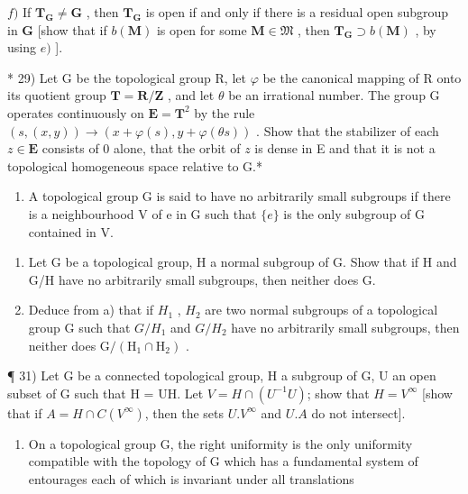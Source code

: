 \(f)\) If \(\mathbf{T}_{\mathbf{G}} \neq \mathbf{G}\) , then \(\mathbf{T}_{\mathbf{G}}\) is open if and only if there is a residual open subgroup in \(\mathbf{G}\) {[}show that if \(b(\mathbf{M})\) is open for some \(\mathbf{M} \in \mathfrak{M}\) , then \(\mathbf{T}_{\mathbf{G}} \supset b(\mathbf{M})\) , by using \(e)\) {]}.

* 29) Let G be the topological group R, let \(\varphi\) be the canonical mapping of R onto its quotient group \(\mathbf{T} = \mathbf{R} / \mathbf{Z}\) , and let \(\theta\) be an irrational number. The group G operates continuously on \(\mathbf{E} = \mathbf{T}^2\) by the rule \((s, (x, y)) \to (x + \varphi(s), y + \varphi(\theta s))\) . Show that the stabilizer of each \(z \in \mathbf{E}\) consists of 0 alone, that the orbit of \(z\) is dense in E and that it is not a topological homogeneous space relative to G.*

\begin{enumerate}
\def\labelenumi{\arabic{enumi})}
\setcounter{enumi}{29}
\tightlist
\item
  A topological group G is said to have no arbitrarily small subgroups if there is a neighbourhood V of e in G such that \(\{e\}\) is the only subgroup of G contained in V.
\end{enumerate}

\begin{enumerate}
\def\labelenumi{\alph{enumi})}
\item
  Let G be a topological group, H a normal subgroup of G. Show that if H and G/H have no arbitrarily small subgroups, then neither does G.
\item
  Deduce from a) that if \(H_{1}\) , \(H_{2}\) are two normal subgroups of a topological group G such that \(G/H_{1}\) and \(G/H_{2}\) have no arbitrarily small subgroups, then neither does \(\mathrm{G}/(\mathrm{H}_{1} \cap \mathrm{H}_{2})\) .
\end{enumerate}

¶ 31) Let G be a connected topological group, H a subgroup of G, U an open subset of G such that H = UH. Let \(V = H \cap (U^{-1}U)\); show that \(H = V^{\infty}\) {[}show that if \(A = H \cap C(V^{\infty})\), then the sets \(U.V^{\infty}\) and \(U.A\) do not intersect{]}.

\BourbakiExerciseGroup

\begin{enumerate}
\def\labelenumi{\arabic{enumi})}
\tightlist
\item
  On a topological group G, the right uniformity is the only uniformity compatible with the topology of G which has a fundamental system of entourages each of which is invariant under all translations
\end{enumerate}


